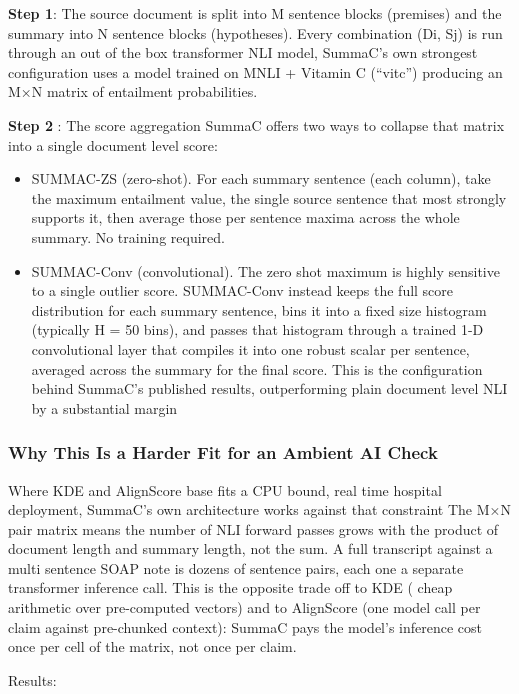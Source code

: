 \documentclass[11pt,a4paper]{article}
\begin{document}
\textbf{Step 1}: The source document is split into M sentence blocks (premises) and the summary into N sentence blocks (hypotheses). Every combination (Di, Sj) is run through an out of the box transformer NLI model,  SummaC's own strongest configuration uses a model trained on MNLI + Vitamin C (“vitc”) producing an M×N matrix of entailment probabilities.

\textbf{Step 2} : The score aggregation SummaC offers two ways to collapse that matrix into a single document level score:
\begin{itemize}
    \item SUMMAC-ZS (zero-shot). For each summary sentence (each column), take the maximum entailment value,  the single source sentence that most strongly supports it, then average those per sentence maxima across the whole summary. No training required.
    \item SUMMAC-Conv (convolutional). The zero shot maximum is highly sensitive to a single outlier score. SUMMAC-Conv instead keeps the full score distribution for each summary sentence, bins it into a fixed size histogram (typically H = 50 bins), and passes that histogram through a trained 1-D convolutional layer that compiles it into one robust scalar per sentence, averaged across the summary for the final score. This is the configuration behind SummaC's published results, outperforming plain document level NLI by a substantial margin \cite{laban2022summac}

\end{itemize}

\subsubsection{Why This Is a Harder Fit for an Ambient AI Check}

Where KDE and AlignScore base fits a CPU bound, real time hospital deployment, SummaC's own architecture works against that constraint The M×N pair matrix means the number of NLI forward passes grows with the product of document length and summary length, not the sum. A  full transcript against a multi sentence SOAP note is dozens of sentence pairs, each one a separate transformer inference call. This is the opposite trade off to KDE ( cheap arithmetic over pre-computed vectors) and to AlignScore (one model call per claim against pre-chunked context): SummaC pays the model's inference cost once per cell of the matrix, not once per claim.

Results:
\end{document}
